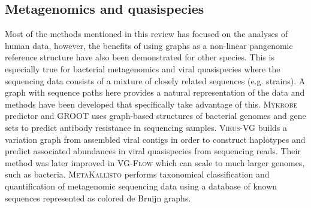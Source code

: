 %

\subsection{Metagenomics and quasispecies}
Most of the methods mentioned in this review has focused on the analyses of human data, however, the benefits of using graphs as a non-linear pangenomic reference structure have also been demonstrated for other species.
This is especially true for bacterial metagenomics and viral quasispecies where the sequencing data consists of a mixture of closely related sequences (e.g. strains).
A graph with sequence paths here provides a natural representation of the data and methods have been developed that specifically take advantage of this. 
\textsc{Mykrobe} predictor \cite{Bradley2015-kl} and \textsc{GROOT} \cite{Rowe2018-bg} uses graph-based structures of bacterial genomes and gene sets to predict antibody resistance in sequencing samples.
\textsc{Virus-VG} \cite{Baaijens2019-ng} builds a variation graph from assembled viral contigs in order to construct haplotypes and predict associated abundances in viral quasispecies from sequencing reads.
Their method was later improved in \textsc{VG-Flow} \cite{Baaijens2019-ha} which can scale to much larger genomes, such as bacteria.  
\textsc{MetaKallisto} \cite{Schaeffer2017-fh} performs taxonomical classification and quantification of metagenomic sequencing data using a database of known sequences represented as colored de Bruijn graphs.

